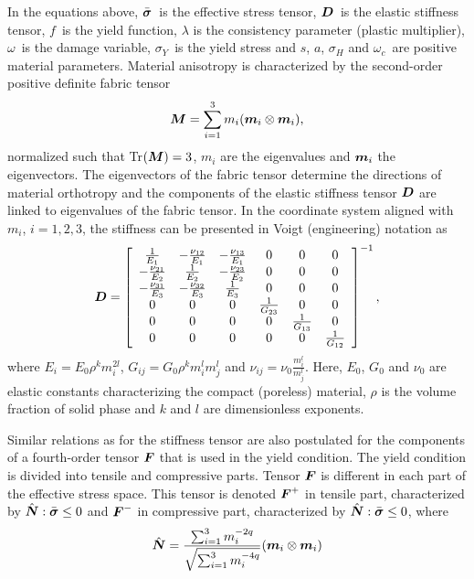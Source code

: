 \documentclass[a4paper]{article}
\newcommand{\mbf}[1]{\mbox{\boldmath$#1$}}
\newcommand{\vsig}{\mbf{\sigma}}%
\begin{document}
In the equations above, $\bar{\vsig}$~is the effective stress tensor, $\mbf{D}$~is the elastic stiffness tensor, $f$~is the yield function, $\lambda$ is the consistency parameter (plastic multiplier), $\omega$~is the damage variable, $\sigma_Y$~is the yield stress and $s$, $a$, $\sigma_H$ and  $\omega_c$~are positive material parameters. 
Material anisotropy is characterized by the second-order positive definite  fabric tensor 
\begin{equation}\label{fabric}
\mbf{M} = \sum_{i=1}^3 m_i(\mbf{m}_i \otimes \mbf{m}_i),
\end{equation}
normalized such that Tr$(\mbf{M}) = 3$, $m_i$ are the eigenvalues and $\mbf{m}_i$ the eigenvectors.
The eigenvectors of the fabric tensor determine the directions of material orthotropy and the components of the elastic stiffness tensor $\mbf{D}$ are linked to eigenvalues of the fabric tensor. In the coordinate system aligned with $m_i$, $i=1,2,3$,
the stiffness can be presented in Voigt (engineering) notation as
\begin{equation}
  \mbf{D}=\left[\begin{array}{cccccc}
\frac{1}{E_1} & -\frac{\nu_{12}}{E_1}&-\frac{\nu_{13}}{E_1}& 0& 0&0\\
-\frac{\nu_{21}}{E_2} & \frac{1}{E_2}&-\frac{\nu_{23}}{E_2}& 0& 0&0\\
-\frac{\nu_{31}}{E_3} & -\frac{\nu_{32}}{E_3}&\frac{1}{E_3}& 0& 0&0\\
0 & 0 & 0 & \frac{1}{G_{23}} & 0 & 0\\
0 & 0 & 0 & 0 & \frac{1}{G_{13}} & 0\\
0 & 0 & 0 & 0 & 0 & \frac{1}{G_{12}}
 \end{array}\right]^{-1},
\end{equation}
where $E_i = E_0\rho^k m_i^{2l}$, $G_{ij} = G_0 \rho^k m_i^l m_j^l$  and $\nu_{ij} = \nu_0 \frac{m_i^l}{m_j^l}$. Here, $E_0$, $G_0$ and $\nu_0$ are elastic constants characterizing the compact (poreless) material, $\rho$ is the volume fraction of solid phase and $k$ and $l$ are dimensionless exponents.

Similar relations as for the stiffness tensor are also postulated for the components of a fourth-order tensor $\mbf{F}$ that is used in the yield condition. The yield condition is divided into tensile and compressive parts. Tensor $\mbf{F}$ is different in each part of the effective stress space. This tensor is denoted $\mbf{F}^{+}$ in tensile part, characterized by $\hat{\mbf{N}}:\bar{\vsig} \leq 0$ and $\mbf{F}^{-}$ in compressive part, characterized by $\hat{\mbf{N}}:\bar{\vsig} \leq 0$, where
\begin{equation}
\hat{\mbf{N}} = \frac{\sum_{i=1}^{3} m_i^{-2q}}{\sqrt{\sum_{i=1}^3 m_i^{-4q}}}(\mbf{m}_i \otimes \mbf{m}_i)
\end{equation}
\end{document}
